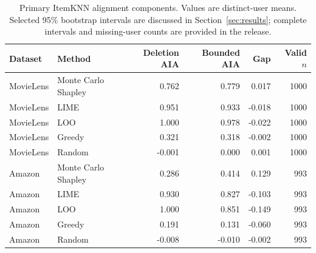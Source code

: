 \begin{table}[t]\centering\small
\caption{Primary ItemKNN alignment components. Values are distinct-user means. Selected 95\% bootstrap intervals are discussed in Section~\ref{sec:results}; complete intervals and missing-user counts are provided in the release.}
\label{tab:aia-components}
\begin{tabular}{llrrrr}
\toprule
Dataset & Method & Deletion AIA & Bounded AIA & Gap & Valid $n$ \\
\midrule
MovieLens & Monte Carlo Shapley & 0.762 & 0.779 & 0.017 & 1000 \\
MovieLens & LIME & 0.951 & 0.933 & -0.018 & 1000 \\
MovieLens & LOO & 1.000 & 0.978 & -0.022 & 1000 \\
MovieLens & Greedy & 0.321 & 0.318 & -0.002 & 1000 \\
MovieLens & Random & -0.001 & 0.000 & 0.001 & 1000 \\
\midrule
Amazon & Monte Carlo Shapley & 0.286 & 0.414 & 0.129 & 993 \\
Amazon & LIME & 0.930 & 0.827 & -0.103 & 993 \\
Amazon & LOO & 1.000 & 0.851 & -0.149 & 993 \\
Amazon & Greedy & 0.191 & 0.131 & -0.060 & 993 \\
Amazon & Random & -0.008 & -0.010 & -0.002 & 993 \\
\bottomrule
\end{tabular}
\end{table}
